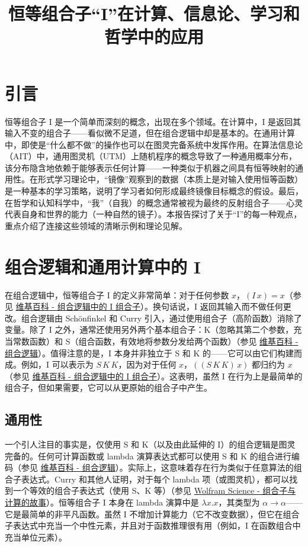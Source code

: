 \documentclass[12pt]{article}
\title{恒等组合子“I”在计算、信息论、学习和哲学中的应用}
\author{}
\date{}
\begin{document}
\maketitle

\section{引言}

恒等组合子 I 是一个简单而深刻的概念，出现在多个领域。在计算中，I 是返回其输入不变的组合子——看似微不足道，但在组合逻辑中却是基本的。在通用计算中，即使是“什么都不做”的操作也可以在图灵完备系统中发挥作用。在算法信息论（AIT）中，通用图灵机（UTM）上随机程序的概念导致了一种通用概率分布，该分布隐含地依赖于能够表示任何计算——一种类似于机器之间具有恒等映射的通用性。在形式学习理论中，“镜像”观察到的数据（本质上是对输入使用恒等函数）是一种基本的学习策略，说明了学习者如何形成最终镜像目标概念的假设。最后，在哲学和认知科学中，“我”（自我）的概念通常被视为最终的反射组合子——心灵代表自身和世界的能力（一种自然的镜子）。本报告探讨了关于“I”的每一种观点，重点介绍了连接这些领域的清晰示例和理论见解。

\section{组合逻辑和通用计算中的 I}

在组合逻辑中，恒等组合子 I 的定义非常简单：对于任何参数 \( x \)，\( (I \, x) = x \)（参见 \href{https://en.wikipedia.org/wiki/Combinatory_logic#The_I_combinator}{维基百科 - 组合逻辑中的 I 组合子}）。换句话说，I 返回其输入而不做任何更改。组合逻辑由 Schönfinkel 和 Curry 引入，通过使用组合子（高阶函数）消除了变量。除了 I 之外，通常还使用另外两个基本组合子：K（忽略其第二个参数，充当常数函数）和 S（组合函数，有效地将参数分发给两个函数）（参见 \href{https://en.wikipedia.org/wiki/Combinatory_logic}{维基百科 - 组合逻辑}）。值得注意的是，I 本身并非独立于 S 和 K 的——它可以由它们构建而成。例如，I 可以表示为 \( S \, K \, K \)，因为对于任何 \( x \)，\( ((S \, K \, K) \, x) \) 都归约为 \( x \)（参见 \href{https://en.wikipedia.org/wiki/Combinatory_logic#The_I_combinator}{维基百科 - 组合逻辑中的 I 组合子}）。这表明，虽然 I 在行为上是最简单的组合子，但如果需要，它可以从更原始的组合子中产生。

\subsection{通用性}

一个引人注目的事实是，仅使用 S 和 K（以及由此延伸的 I）的组合逻辑是图灵完备的。任何可计算函数或 lambda 演算表达式都可以使用 S 和 K 的组合进行编码（参见 \href{https://en.wikipedia.org/wiki/Combinatory_logic}{维基百科 - 组合逻辑}）。实际上，这意味着存在行为类似于任意算法的组合子表达式。Curry 和其他人证明，对于每个 lambda 项（或图灵机），都可以找到一个等效的组合子表达式（使用 S、K 等）（参见 \href{https://wolframscience.com/writings/combinators-and-the-story-of-computation/}{Wolfram Science - 组合子与计算的故事}）。恒等组合子 I 本身在 lambda 演算中是 \( \lambda x.x \)，其类型为 \( \alpha \to \alpha \)——它是最简单的非平凡函数。虽然 I 不增加计算能力（它不改变数据），但它在组合子表达式中充当一个中性元素，并且对于函数推理很有用（例如，I 在函数组合中充当单位元素）。
\end{document}
